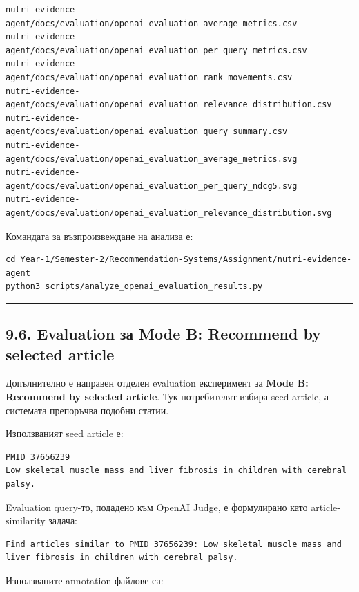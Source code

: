 \documentclass[12pt,a4paper]{article}
\begin{document}
\begin{verbatim}
nutri-evidence-agent/docs/evaluation/openai_evaluation_average_metrics.csv
nutri-evidence-agent/docs/evaluation/openai_evaluation_per_query_metrics.csv
nutri-evidence-agent/docs/evaluation/openai_evaluation_rank_movements.csv
nutri-evidence-agent/docs/evaluation/openai_evaluation_relevance_distribution.csv
nutri-evidence-agent/docs/evaluation/openai_evaluation_query_summary.csv
nutri-evidence-agent/docs/evaluation/openai_evaluation_average_metrics.svg
nutri-evidence-agent/docs/evaluation/openai_evaluation_per_query_ndcg5.svg
nutri-evidence-agent/docs/evaluation/openai_evaluation_relevance_distribution.svg
\end{verbatim}

Командата за възпроизвеждане на анализа е:

\begin{verbatim}
cd Year-1/Semester-2/Recommendation-Systems/Assignment/nutri-evidence-agent
python3 scripts/analyze_openai_evaluation_results.py
\end{verbatim}

\vspace{0.5em}\hrule\vspace{1.0em}

\subsection{9.6. Evaluation за Mode B: Recommend by selected article}\label{evaluation-ux437ux430-mode-b-recommend-by-selected-article}

Допълнително е направен отделен evaluation експеримент за \textbf{Mode B: Recommend by selected article}. Тук потребителят избира seed article, а системата препоръчва подобни статии.

Използваният seed article е:

\begin{verbatim}
PMID 37656239
Low skeletal muscle mass and liver fibrosis in children with cerebral palsy.
\end{verbatim}

Evaluation query-то, подадено към OpenAI Judge, е формулирано като article-similarity задача:

\begin{verbatim}
Find articles similar to PMID 37656239: Low skeletal muscle mass and liver fibrosis in children with cerebral palsy.
\end{verbatim}

Използваните annotation файлове са:
\end{document}
